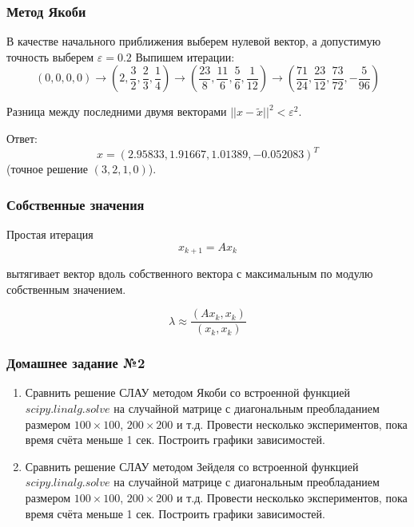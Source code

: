 \documentclass[10pt]{beamer}
\begin{document}
\begin{frame}[fragile]
\frametitle{Метод Якоби}
В качестве начального приближения выберем нулевой вектор, а допустимую точность выберем $\varepsilon = 0.2$ Выпишем итерации:
$$
(0, 0, 0, 0)  \rightarrow
\left( 2, \frac{3}{2}, \frac{2}{3}, \frac{1}{4} \right) \rightarrow
\left( \frac{23}{8}, \frac{11}{6}, \frac{5}{6}, \frac{1}{12} \right) \rightarrow
\left( \frac{71}{24}, \frac{23}{12}, \frac{73}{72}, -\frac{5}{96} \right)
$$

Разница между последними двумя векторами $||x - \tilde{x}||^2 < \varepsilon^2$. 

Ответ: 
$$x = (2.95833, 1.91667, 1.01389, -0.052083)^T$$
(точное решение $(3, 2, 1, 0)$).

\end{frame}




\begin{frame}[fragile]
\frametitle{Собственные значения}

Простая итерация
$$x_{k+1} = A x_k$$

вытягивает вектор вдоль собственного вектора с максимальным по модулю собственным значением.

$$ \lambda \approx \frac{(Ax_k, x_k)}{(x_k, x_k)}$$

\end{frame}

\begin{frame}[fragile]
\frametitle{Домашнее задание №2}

\begin{enumerate}
\item Сравнить решение СЛАУ методом Якоби со встроенной функцией $scipy.linalg.solve$ на случайной матрице с диагональным преобладанием размером $100 \times 100$, $200 \times 200$ и т.д. Провести несколько экспериментов, пока время счёта меньше 1 сек. Построить графики зависимостей.

\item Сравнить решение СЛАУ методом Зейделя со встроенной функцией $scipy.linalg.solve$ на случайной матрице с диагональным преобладанием размером $100 \times 100$, $200 \times 200$ и т.д. Провести несколько экспериментов, пока время счёта меньше 1 сек. Построить графики зависимостей.

\end{enumerate}

\end{frame}
\end{document}
